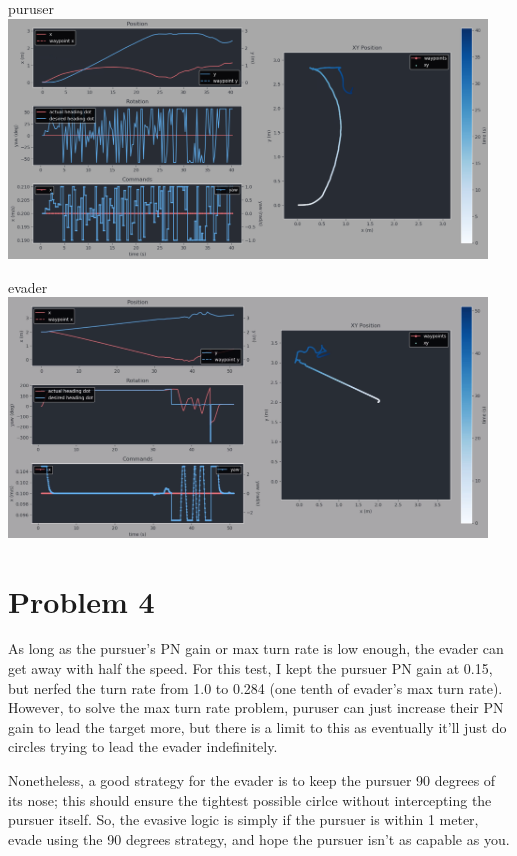 \documentclass{article}
\begin{document}
    \newpage
    \begin{center}
        puruser \break
        \includegraphics[width=5in]{pursuer_random_evader_2.png} \break

        evader \break
        \includegraphics[width=5in]{evader_random_evader_2.png}
    \end{center}
        
    \newpage
    \section*{Problem 4}
    As long as the pursuer's PN gain or max turn rate is low enough, the evader can get away with half the speed. For this test, I kept the pursuer PN gain at 0.15, but nerfed the turn rate from 1.0 to 0.284 (one tenth of evader's max turn rate). However, to solve the max turn rate problem, puruser can just increase their PN gain to lead the target more, but there is a limit to this as eventually it'll just do circles trying to lead the evader indefinitely. \break

    Nonetheless, a good strategy for the evader is to keep the pursuer 90 degrees of its nose; this should ensure the tightest possible cirlce without intercepting the pursuer itself. \break
    So, the evasive logic is simply if the pursuer is within 1 meter, evade using the 90 degrees strategy, and hope the pursuer isn't as capable as you. \break
\end{document}
